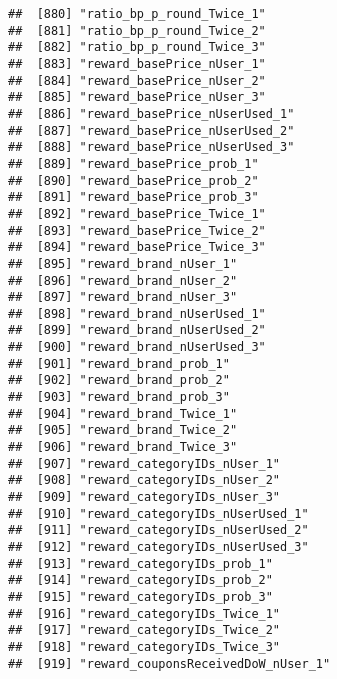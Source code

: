 \documentclass[10pt]{report}
\begin{document}
\begin{verbatim}
##  [880] "ratio_bp_p_round_Twice_1"                             
##  [881] "ratio_bp_p_round_Twice_2"                             
##  [882] "ratio_bp_p_round_Twice_3"                             
##  [883] "reward_basePrice_nUser_1"                             
##  [884] "reward_basePrice_nUser_2"                             
##  [885] "reward_basePrice_nUser_3"                             
##  [886] "reward_basePrice_nUserUsed_1"                         
##  [887] "reward_basePrice_nUserUsed_2"                         
##  [888] "reward_basePrice_nUserUsed_3"                         
##  [889] "reward_basePrice_prob_1"                              
##  [890] "reward_basePrice_prob_2"                              
##  [891] "reward_basePrice_prob_3"                              
##  [892] "reward_basePrice_Twice_1"                             
##  [893] "reward_basePrice_Twice_2"                             
##  [894] "reward_basePrice_Twice_3"                             
##  [895] "reward_brand_nUser_1"                                 
##  [896] "reward_brand_nUser_2"                                 
##  [897] "reward_brand_nUser_3"                                 
##  [898] "reward_brand_nUserUsed_1"                             
##  [899] "reward_brand_nUserUsed_2"                             
##  [900] "reward_brand_nUserUsed_3"                             
##  [901] "reward_brand_prob_1"                                  
##  [902] "reward_brand_prob_2"                                  
##  [903] "reward_brand_prob_3"                                  
##  [904] "reward_brand_Twice_1"                                 
##  [905] "reward_brand_Twice_2"                                 
##  [906] "reward_brand_Twice_3"                                 
##  [907] "reward_categoryIDs_nUser_1"                           
##  [908] "reward_categoryIDs_nUser_2"                           
##  [909] "reward_categoryIDs_nUser_3"                           
##  [910] "reward_categoryIDs_nUserUsed_1"                       
##  [911] "reward_categoryIDs_nUserUsed_2"                       
##  [912] "reward_categoryIDs_nUserUsed_3"                       
##  [913] "reward_categoryIDs_prob_1"                            
##  [914] "reward_categoryIDs_prob_2"                            
##  [915] "reward_categoryIDs_prob_3"                            
##  [916] "reward_categoryIDs_Twice_1"                           
##  [917] "reward_categoryIDs_Twice_2"                           
##  [918] "reward_categoryIDs_Twice_3"                           
##  [919] "reward_couponsReceivedDoW_nUser_1"                    

\end{verbatim}
\end{document}

